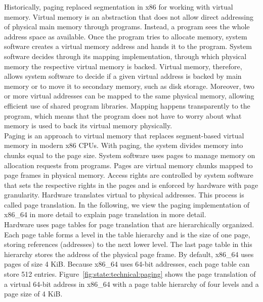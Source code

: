 Historically, paging replaced segmentation in x86 for working with virtual
memory. Virtual memory is an abstraction that does not allow direct addressing
of physical main memory through programs. Instead, a program sees the whole
address space as available. Once the program tries to allocate memory, system
software creates a virtual memory address and hands it to the program. System
software decides through its mapping implementation, through which physical
memory the respective virtual memory is backed. Virtual memory, therefore,
allows system software to decide if a given virtual address is backed by main
memory or to move it to secondary memory, such as disk storage. Moreover, two or
more virtual addresses can be mapped to the same physical memory, allowing
efficient use of shared program libraries. Mapping happens transparently to the
program, which means that the program does not have to worry about what memory
is used to back its virtual memory physically.\\

Paging is an approach to virtual memory that replaces segment-based virtual
memory in modern x86 CPUs. With paging, the system divides memory into chunks
equal to the page size. System software uses pages to manage memory on
allocation requests from programs. Pages are virtual memory chunks mapped to
page frames in physical memory. Access rights are controlled by system software
that sets the respective rights in the pages and is enforced by hardware with
page granularity. Hardware translates virtual to physical addresses. This
process is called page translation. In the following, we view the paging
implementation of x86\_64 in more detail to explain page translation in more
detail.\\

Hardware uses page tables for page translation that are hierarchically
organized. Each page table forms a level in the table hierarchy and is the size
of one page, storing references (addresses) to the next lower level. The last
page table in this hierarchy stores the address of the physical page frame. By
default, x86\_64 uses pages of size 4 KiB. Because x86\_64 uses 64-bit
addresses, each page table can store 512 entries.
Figure~\ref{fig:state:technical:paging} shows the page translation of a virtual
64-bit address in x86\_64 with a page table hierarchy of four levels and a page
size of 4 KiB. \\

